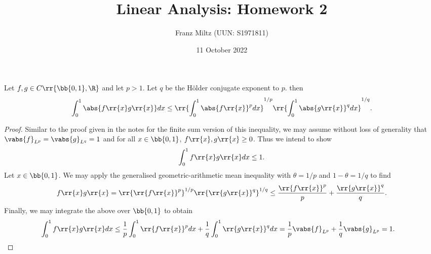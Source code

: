 \documentclass{article}
\begin{document}
\title{Linear Analysis: Homework 2}
\author{Franz Miltz (UUN: S1971811)}
\date{11 October 2022}
\maketitle

\begin{claim*}[2a]
  Let $f,g\in C\rr{\bb{0,1}, \R}$ and let $p>1$. Let $q$ be the H\"older conjugate exponent
  to $p$. then
  \begin{align}
    \label{holder}
    \int_0^1 \abs{f\rr{x}g\rr{x}}dx \leq \rr{\int_0^1 \abs{f\rr{x}}^p dx}^{1/p}\rr{\int_0^1 \abs{g\rr{x}}^q dx}^{1/q}.
  \end{align}
  \begin{proof}
    Similar to the proof given in the notes for the finite sum version of this inequality, we may assume without
    loss of generality that $\vabs{f}_{L^p}=\vabs{g}_{L^q}=1$ and for all $x\in\bb{0,1}$, $f\rr{x},g\rr{x}\geq 0$.
    Thus we intend to show
    \begin{align*}
      \int_0^1 f\rr{x}g\rr{x} dx \leq 1.
    \end{align*}
    Let $x\in\bb{0,1}$. We may apply the generalised geometric-arithmetic mean inequality with
    $\theta=1/p$ and $1-\theta=1/q$ to find
    \begin{align*}
      f\rr{x}g\rr{x}=\rr{\rr{f\rr{x}}^p}^{1/p} \rr{\rr{g\rr{x}}^q}^{1/q} \leq \frac{\rr{f\rr{x}}^p}{p} + \frac{\rr{g\rr{x}}^q}{q}.
    \end{align*}
    Finally, we may integrate the above over $\bb{0,1}$ to obtain
    \begin{align*}
      \int_0^1 f\rr{x}g\rr{x} dx & \leq \frac{1}{p}\int_0^1 \rr{f\rr{x}}^p dx + \frac{1}{q}\int_0^1 \rr{g\rr{x}}^q dx
      = \frac{1}{p} \vabs{f}_{L^p} + \frac{1}{q} \vabs{g}_{L^p} = 1.
    \end{align*}
  \end{proof}
\end{claim*}
\end{document}
